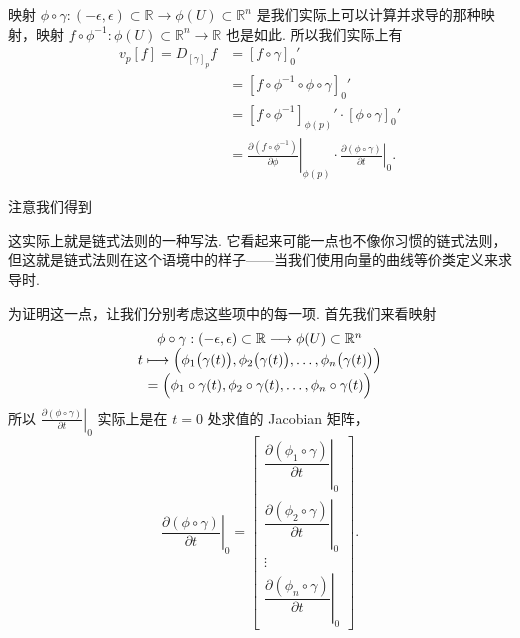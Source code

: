 映射 $\phi\circ\gamma:(-\epsilon,\epsilon)\subset\mathbb{R}\to\phi(U)\subset\mathbb{R}^n$ 是我们实际上可以计算并求导的那种映射，映射 $f\circ\phi^{-1}:\phi(U)\subset\mathbb{R}^n\to\mathbb{R}$ 也是如此. 所以我们实际上有
\[
\begin{aligned}
v_p[f]=D_{[\gamma]_p}f&=[f\circ\gamma]_0'\\
&=[f\circ\phi^{-1}\circ\phi\circ\gamma]_0'\\
&=[f\circ\phi^{-1}]_{\phi(p)}'\cdot[\phi\circ\gamma]_0'\\
&=\left.\frac{\partial(f\circ\phi^{-1})}{\partial\phi}\right|_{\phi(p)}\cdot\left.\frac{\partial(\phi\circ\gamma)}{\partial t}\right|_0.
\end{aligned}
\]

注意我们得到
\begin{center}
\end{center}

这实际上就是链式法则的一种写法. 它看起来可能一点也不像你习惯的链式法则，但这就是链式法则在这个语境中的样子——当我们使用向量的曲线等价类定义来求导时.

为证明这一点，让我们分别考虑这些项中的每一项. 首先我们来看映射
\[
\begin{array}{c}
\phi\circ\gamma:(-\epsilon,\epsilon)\subset\mathbb{R}\longrightarrow\phi(U)\subset\mathbb{R}^n\\
t\longmapsto\Bigl(\phi_1\bigl(\gamma(t)\bigr),\phi_2\bigl(\gamma(t)\bigr),\ldots,\phi_n\bigl(\gamma(t)\bigr)\Bigr)\\
=\Bigl(\phi_1\circ\gamma(t),\phi_2\circ\gamma(t),\ldots,\phi_n\circ\gamma(t)\Bigr)
\end{array}
\]
所以 $\left.\frac{\partial(\phi\circ\gamma)}{\partial t}\right|_0$ 实际上是在 $t=0$ 处求值的 Jacobian 矩阵，
\[
\left.\frac{\partial(\phi\circ\gamma)}{\partial t}\right|_0=\begin{bmatrix}\left.\dfrac{\partial(\phi_1\circ\gamma)}{\partial t}\right|_0\\[1.2em] \left.\dfrac{\partial(\phi_2\circ\gamma)}{\partial t}\right|_0\\[1.2em] \vdots\\[0.6em] \left.\dfrac{\partial(\phi_n\circ\gamma)}{\partial t}\right|_0\end{bmatrix}.
\]

